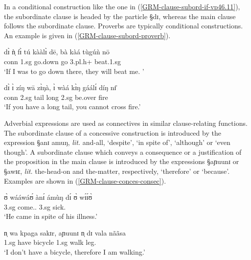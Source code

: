 In a conditional construction like the one in
(\ref{GRM-clause-subord-if-vp46.11}), the subordinate
clause is headed by the particle {\S dɪ},  whereas the main clause follows
the subordinate clause. Proverbs are typically  conditional
constructions.  An example is given in (\ref{GRM-clause-subord-proverb}).


\begin{exe}
\ex\label{GRM-clause-subord-di}
\begin{xlist}
\ex\label{GRM-clause-subord-if-vp46.11}

\gll dɪ̀ ǹ̩ fɪ̀ tú kààlɪ̀ dē, bà kàá  tùgúǹ nō \\
      {\sc conn}  {\sc 1.sg} {\mod} {go.down} go {\adv} {\sc 3.pl.h+} {\fut}
beat.{\sc 1.sg} {\foc} \\
\glt  `If I was to go down there, they will beat me. ' 

\ex\label{GRM-clause-subord-proverb}
\gll dɪ̀ ɪ̀ zíŋ wā zɪ̀ŋà,  ɪ̀ wàá kɪ̀ŋ gáálɪ́ díŋ nɪ̄ \\
  {\sc conn} {\sc 2.sg}  tail {\ingr} long  {\sc 2.sg} {\neg} {\abl} be.over
fire
{\postp}\\
`If you have a long tail, you cannot cross fire.'

\end{xlist}
 \end{exe}
 

Adverbial expressions are used as connectives in similar clause-relating
functions. The subordinate clause of a concessive construction is introduced by
the expression  {\S anɪ amuŋ}, {\it lit.} and-all, `despite',  `in spite
of', `although' or `even though'. A subordinate clause  which conveys a
consequence or a justification of the proposition in the main clause  is
introduced by the expressions {\S aɲuunɪ} or {\S awɪɛ}, {\it lit.} the-head-on
 and  the-matter,  respectively,  `therefore' or
`because'. Examples are shown in (\ref{GRM-clause-conces-consec}).

\begin{exe}
\ex\label{GRM-clause-conces-consec}
\begin{xlist}
\ex\label{GRM-clause-conces}

\gll ʊ̀ wááwáʊ́ {ànɪ́ ámùŋ} dɪ́ ʊ̀ wɪ́ɪ́ʊ̀ \\
       {\sc 3.sg} come.{\pfv .\foc} {\conn} {\comp}  {\sc 3.sg} sick.{\foc}\\
\glt  `He came in spite of his illness.' 


\ex\label{GRM-clause-consec-1}

\gll n̩ wa kpaga sakɪr, {aɲuunɪ} n̩ dɪ vala nããsa \\
{\sc 1.sg} {\neg} have bicycle {\conn} {\sc 1.sg}   {\ipfv} walk
leg.{\pl}\\
\glt `I don't have a bicycle, therefore I am
walking.'

\end{xlist}
 \end{exe}
 

